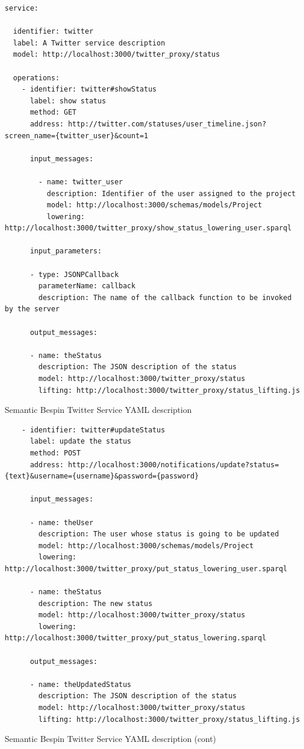 \begin{table}
\vspace{5 mm}
\begin{lstlisting}
service:

  identifier: twitter
  label: A Twitter service description
  model: http://localhost:3000/twitter_proxy/status

  operations:
    - identifier: twitter#showStatus
      label: show status
      method: GET
      address: http://twitter.com/statuses/user_timeline.json?screen_name={twitter_user}&count=1

      input_messages:

        - name: twitter_user
          description: Identifier of the user assigned to the project
          model: http://localhost:3000/schemas/models/Project
          lowering: http://localhost:3000/twitter_proxy/show_status_lowering_user.sparql

      input_parameters:

      - type: JSONPCallback
        parameterName: callback
        description: The name of the callback function to be invoked by the server

      output_messages:

      - name: theStatus
        description: The JSON description of the status
        model: http://localhost:3000/twitter_proxy/status
        lifting: http://localhost:3000/twitter_proxy/status_lifting.js
\end{lstlisting} 
\vspace{5 mm}
\caption{Semantic Bespin Twitter Service YAML description}
\label{bespin_twitter_yaml}
\end{table}

\begin{table}
\vspace{5 mm}
\begin{lstlisting}
    - identifier: twitter#updateStatus
      label: update the status
      method: POST
      address: http://localhost:3000/notifications/update?status={text}&username={username}&password={password}
      
      input_messages:
      
      - name: theUser
        description: The user whose status is going to be updated
        model: http://localhost:3000/schemas/models/Project
        lowering: http://localhost:3000/twitter_proxy/put_status_lowering_user.sparql

      - name: theStatus
        description: The new status
        model: http://localhost:3000/twitter_proxy/status
        lowering: http://localhost:3000/twitter_proxy/put_status_lowering.sparql

      output_messages:

      - name: theUpdatedStatus
        description: The JSON description of the status
        model: http://localhost:3000/twitter_proxy/status
        lifting: http://localhost:3000/twitter_proxy/status_lifting.js
\end{lstlisting} 
\vspace{5 mm}
\caption{Semantic Bespin Twitter Service YAML description (cont)}
\label{bespin_twitter_yam_2}
\end{table}

